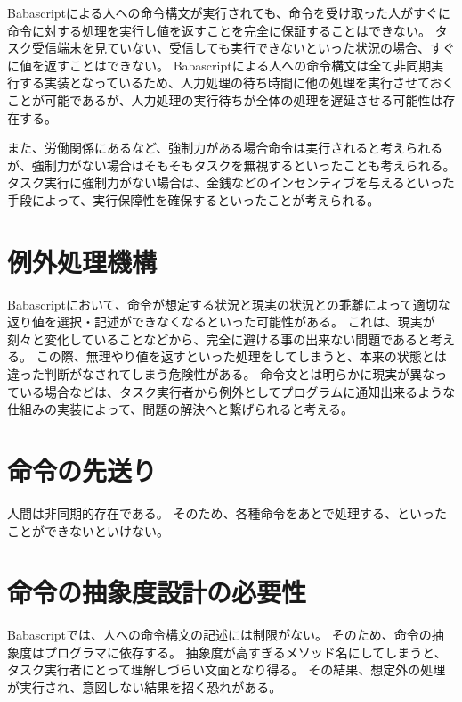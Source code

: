 Babascriptによる人への命令構文が実行されても、命令を受け取った人がすぐに命令に対する処理を実行し値を返すことを完全に保証することはできない。
タスク受信端末を見ていない、受信しても実行できないといった状況の場合、すぐに値を返すことはできない。
Babascriptによる人への命令構文は全て非同期実行する実装となっているため、人力処理の待ち時間に他の処理を実行させておくことが可能であるが、人力処理の実行待ちが全体の処理を遅延させる可能性は存在する。

また、労働関係にあるなど、強制力がある場合命令は実行されると考えられるが、強制力がない場合はそもそもタスクを無視するといったことも考えられる。
タスク実行に強制力がない場合は、金銭などのインセンティブを与えるといった手段によって、実行保障性を確保するといったことが考えられる。

\section{例外処理機構}\label{ux4f8bux5916ux51e6ux7406ux6a5fux69cb}

Babascriptにおいて、命令が想定する状況と現実の状況との乖離によって適切な返り値を選択・記述ができなくなるといった可能性がある。
これは、現実が刻々と変化していることなどから、完全に避ける事の出来ない問題であると考える。
この際、無理やり値を返すといった処理をしてしまうと、本来の状態とは違った判断がなされてしまう危険性がある。
命令文とは明らかに現実が異なっている場合などは、タスク実行者から例外としてプログラムに通知出来るような仕組みの実装によって、問題の解決へと繋げられると考える。

\section{命令の先送り}\label{ux547dux4ee4ux306eux5148ux9001ux308a}

人間は非同期的存在である。
そのため、各種命令をあとで処理する、といったことができないといけない。

\section{命令の抽象度設計の必要性}\label{ux547dux4ee4ux306eux62bdux8c61ux5ea6ux8a2dux8a08ux306eux5fc5ux8981ux6027}

Babascriptでは、人への命令構文の記述には制限がない。
そのため、命令の抽象度はプログラマに依存する。
抽象度が高すぎるメソッド名にしてしまうと、タスク実行者にとって理解しづらい文面となり得る。
その結果、想定外の処理が実行され、意図しない結果を招く恐れがある。

